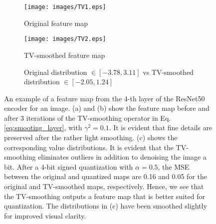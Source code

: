 \documentclass[reqno]{amsart}
\begin{document}
\begin{figure}
\begin{center}
\begin{subfigure}[b]{0.48\textwidth}
         \centering
         \texttt{[image: images/TV1.eps]}
         \caption{Original feature map}
     \end{subfigure}
     \hfill
     \begin{subfigure}[b]{0.48\textwidth}
         \centering
         \texttt{[image: images/TV2.eps]}
         \caption{TV-smoothed feature map}
     \end{subfigure}
     
     \bigskip
     
     \begin{subfigure}{\linewidth}
        \centering
        \caption{Original distribution  $\in [-3.78,3.11]$ vs TV-smoothed distribution $\in [-2.05, 1.24]$}
    \end{subfigure}
     \hfill
\caption{An example of a feature map from the 4-th layer of the ResNet50 encoder for an image. (a) and (b) show the feature map before and after 3 iterations of the TV-smoothing operator in Eq. \eqref{eq:smooting_layer}, with $\gamma^2=0.1$. It is evident that fine details are preserved after the rather light smoothing. (c) shows the corresponding value distributions. It is evident that the TV-smoothing eliminates outliers in addition to denoising the image a bit. After a 4-bit signed quantization with $\alpha = 0.5$, the MSE between the original and quantized maps are 0.16 and 0.05 for the original and TV-smoothed maps, respectively. Hence, we see that the TV-smoothing outputs a feature map that is better suited for quantization. The distributions in (c) have been smoothed slightly for improved visual clarity.}
\label{fig:TV}
\end{center}
\end{figure}
\end{document}
